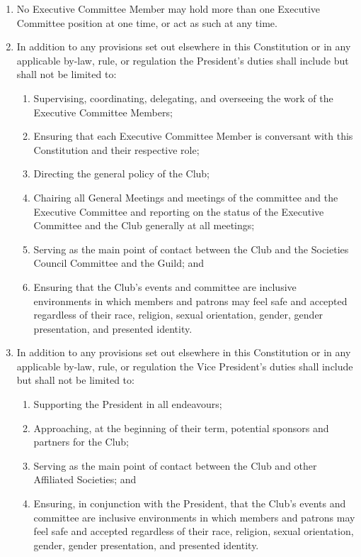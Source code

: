 \documentclass[12pt]{article}
\begin{document}
\begin{enumerate}[label=9.\arabic*]
\begin{enumerate}[label=\theenumi.\arabic*]
    \end{enumerate}
\item No Executive Committee Member may hold more than one Executive Committee position at one time, or act as such at any time.
\item In addition to any provisions set out elsewhere in this Constitution or in any applicable by-law, rule, or regulation the President's duties shall include but shall not be limited to:
    \begin{enumerate}[label=\theenumi.\arabic*]
        \item Supervising, coordinating, delegating, and overseeing the work of the Executive Committee Members;
        \item Ensuring that each Executive Committee Member is conversant with this Constitution and their respective role;
        \item Directing the general policy of the Club;
        \item Chairing all General Meetings and meetings of the committee and the Executive Committee and reporting on the status of the Executive Committee and the Club generally at all meetings;
        \item Serving as the main point of contact between the Club and the Societies Council Committee and the Guild; and
        \item Ensuring that the Club's events and committee are inclusive environments in which members and patrons may feel safe and accepted regardless of their race, religion, sexual orientation, gender, gender presentation, and presented identity.
    \end{enumerate}
\item In addition to any provisions set out elsewhere in this Constitution or in any applicable by-law, rule, or regulation the Vice President's duties shall include but shall not be limited to:
    \begin{enumerate}[label=\theenumi.\arabic*]
        \item Supporting the President in all endeavours;
        \item Approaching, at the beginning of their term, potential sponsors and partners for the Club;
        \item Serving as the main point of contact between the Club and other Affiliated Societies; and
        \item Ensuring, in conjunction with the President, that the Club's events and committee are inclusive environments in which members and patrons may feel safe and accepted regardless of their race, religion, sexual orientation, gender, gender presentation, and presented identity.

\end{enumerate}
\end{enumerate}
\end{document}
